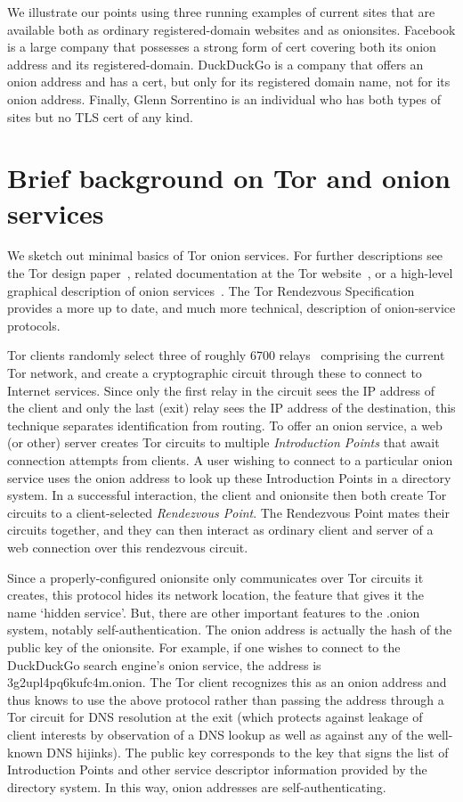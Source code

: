 \documentclass[10pt, conference, compsocconf]{styles/IEEEtran}
\begin{document}
We illustrate our points using three running examples
of current sites that are available both as ordinary registered-domain
websites and as onionsites. Facebook is a large company that
possesses a strong form of cert covering both its onion address and its
registered-domain. DuckDuckGo is a company that offers an
onion address and has a cert, but only for its registered domain name,
not for its onion address.  Finally, Glenn Sorrentino is an
individual who has both types of sites but no TLS cert of any kind.

\section{Brief background on Tor and onion services}

We sketch out minimal basics of Tor onion services. For further
descriptions see the Tor design paper~\cite{tor-design}, related
documentation at the Tor website~\cite{torproject}, or a high-level
graphical description of onion services~\cite{tor-hs}. The Tor
Rendezvous Specification~\cite{tor-rend-spec} provides a more up to
date, and much more technical, description of onion-service
protocols.

Tor clients randomly select three of roughly 6700 relays~\cite{tor-network-size}
comprising the current Tor network, and create a cryptographic circuit
through these to connect to Internet services. Since only the first
relay in the circuit sees the IP address of the client and
only the last (exit) relay sees the IP address of the destination,
this technique separates identification from routing.
To offer an onion service, a web (or other) server creates Tor circuits to
multiple \emph{Introduction Points} that await connection attempts
from clients. A user wishing to connect to a particular onion service
uses the onion address to look up these Introduction Points in a
directory system. In a successful interaction, the client and
onionsite then both create Tor circuits to a client-selected
\emph{Rendezvous Point}. The Rendezvous Point mates their circuits
together, and they can then interact as ordinary client and server of
a web connection over this rendezvous circuit.

Since a properly-configured onionsite only communicates over Tor
circuits it creates,
this protocol hides its network location, the feature that
gives it the name `hidden service'. But, there are other important
features to the .onion system, notably self-authentication. The onion
address is actually the hash of the public key of the onionsite. 
For example, if one wishes to connect to the DuckDuckGo search engine's
onion service, the address is 3g2upl4pq6kufc4m.onion. The Tor client
recognizes this as an onion address and thus knows to use the above
protocol rather than passing the address through a Tor
circuit for DNS resolution at the exit (which protects against leakage
of client interests by observation of a DNS lookup as well as against
any of the well-known DNS hijinks). The public key corresponds to the
key that signs the list of Introduction Points and other service
descriptor information provided by the directory system. In this way,
onion addresses are self-authenticating.
\end{document}
